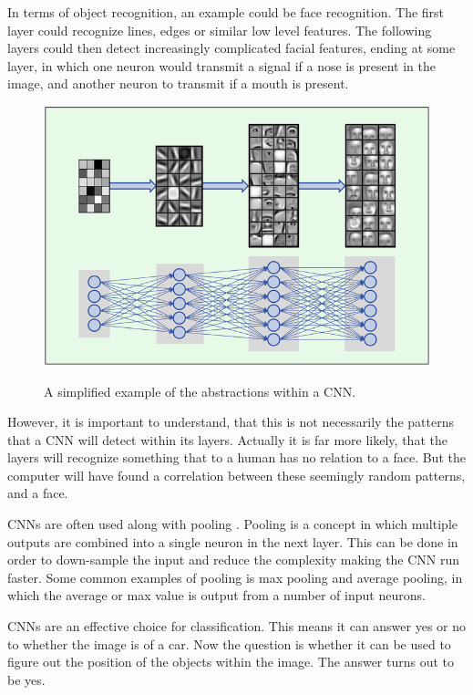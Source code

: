 In terms of object recognition, an example could be face recognition.
The first layer could recognize lines, edges or similar low level features.
The following layers could then detect increasingly complicated facial features, ending at some layer, in which one neuron would transmit a signal if a nose is present in the image, and another neuron to transmit if a mouth is present.


\begin{figure}[H]
	\centering
	\includegraphics[scale=0.40]{images/cnn_face.jpg}
	\caption{A simplified example of the abstractions within a CNN.}
	\label{fig:face_cnn}
	\cite{CNNStructure}
\end{figure}
 
However, it is important to understand, that this is not necessarily the patterns that a CNN will detect within its layers.
Actually it is far more likely, that the layers will recognize something that to a human has no relation to a face.
But the computer will have found a correlation between these seemingly random patterns, and a face.

CNNs are often used along with pooling \cite{CNN}.
Pooling is a concept in which multiple outputs are combined into a single neuron in the next layer.
This can be done in order to down-sample the input and reduce the complexity making the CNN run faster.
Some common examples of pooling is max pooling and average pooling, in which the average or max value is output from a number of input neurons.

CNNs are an effective choice for classification. 
This means it can answer yes or no to whether the image is of a car.
Now the question is whether it can be used to figure out the position of the objects within the image.
The answer turns out to be yes.


